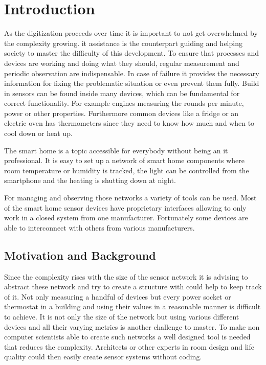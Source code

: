\chapter{Introduction}
As the digitization proceeds over time it is important to not get overwhelmed by the complexity growing. \gls{it} assistance is the counterpart guiding and helping society to master the difficulty of this development. To ensure that processes and devices are working and doing what they should, regular measurement and periodic observation are indispensable. In case of failure it provides the necessary information for fixing the problematic situation or even prevent them fully. Build in sensors can be found inside many devices, which can be fundamental for correct functionality. For example engines measuring the rounds per minute, power or other properties. Furthermore common devices like a fridge or an electric oven has thermometers since they need to know how much and when to cool down or heat up. 

The smart home is a topic accessible for everybody without being an \gls{it} professional. It is easy to set up a network of smart home components where room temperature or humidity is tracked, the light can be controlled from the smartphone and the heating is shutting down at night. 

For managing and observing those networks a variety of tools can be used. Most of the smart home sensor devices have proprietary interfaces allowing to only work in a closed system from one manufacturer. Fortunately some devices are able to interconnect with others from various manufacturers. 

\section{Motivation and Background}
Since the complexity rises with the size of the sensor network it is advising to abstract these network and try to create a structure with could help to keep track of it. Not only measuring a handful of devices but every power socket or thermostat in a building and using their values in a reasonable manner is difficult to achieve. It is not only the size of the network but using various different devices and all their varying metrics is another challenge to master. To make non computer scientists able to create such networks a well designed tool is needed that reduces the complexity. Architects or other experts in room design and life quality could then easily create sensor systems without coding.

